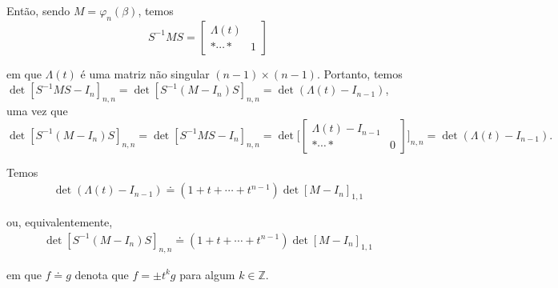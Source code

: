 	\par\vspace{0.3cm} Então, sendo $M = \varphi_n(\beta)$, temos
	\begin{equation*}
	S^{-1}MS = \left[\begin{array}{c|c}
	\Lambda(t) & \\
	\hline 
	\ast \cdots \ast & 1
	\end{array}\right] 
	\end{equation*}
	\par\vspace{0.3cm} em que $\Lambda(t)$ é uma matriz não singular $(n-1)\times(n-1)$. Portanto, temos $ \det[ S^{-1}MS - I_n]_{n,n} = \det[S^{-1}(M - I_n)S]_{n,n} = \det(\Lambda(t) - I_{n-1})$, uma vez que
	\begin{equation*}
	\det[S^{-1}(M - I_n)S]_{n,n} = \det[S^{-1}MS - I_n]_{n,n} = \det\Bigg[ \left[\begin{array}{c|c}
	\Lambda(t) - I_{n-1} & \\
	\hline
	\ast\cdots\ast & 0
	\end{array}\right]\Bigg]_{n,n} = \det(\Lambda(t) - I_{n-1}). 
	\end{equation*}
	\begin{lemma}
		\label{lema Alexander}
		Temos 
		\begin{align*}
		\det(\Lambda(t) - I_{n-1}) \doteq(1+t+\cdots+t^{n-1})\det[M-I_n]_{1,1}
		\end{align*}
		\par\vspace{0.3cm} ou, equivalentemente, 
		\begin{align*}
		\det[S^{-1}(M - I_{n})S]_{n,n} \doteq(1+t+\cdots+t^{n-1})\det[M-I_n]_{1,1}
		\end{align*}
		\par\vspace{0.3cm} em que $f\doteq g$ denota que $f = \pm t^kg$ para algum $k\in\mathbb{Z}$.
	\end{lemma}
	
